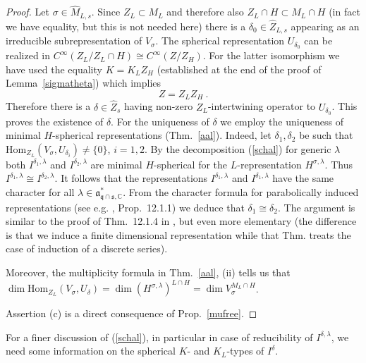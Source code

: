 \documentclass[10]{amsart}
\theoremstyle{remark}
\theoremstyle{definition}
\numberwithin{equation}{section}
\newcommand{\C}{\mathbb{C}}           %
\newcommand{\Hom}{\mathrm{Hom}}
\newcommand{\fa}{{\mathfrak a}}             %
\newcommand{\fq}{{\mathfrak q}}
\newcommand{\fs}{{\mathfrak s}}
\newcommand{\be}{\begin{equation}}
\begin{document}
{\begin{proof} Let $\sigma\in\widehat M_{L,s}$. Since $Z_L\subset M_L$ and therefore also $Z_L\cap H\subset M_L\cap H$ (in fact we have equality, but this is not needed here) there is a $\delta_0\in\widehat Z_{L,s}$ appearing as an irreducible subrepresentation of $V_\sigma$. The spherical representation $U_{\delta_0}$ can be realized in $C^\infty(Z_L/Z_L\cap H)\cong C^\infty(Z/Z_H)$.
For the latter isomorphism we have used
the equality $K=K_LZ_H$ (established at the end of the proof of Lemma~\ref{sigmatheta}) which implies 
\be\label{stand}Z=Z_LZ_H\ .
\end{equation} Therefore there is a $\delta\in \widehat Z_s$ having non-zero $Z_L$-intertwining operator to $U_{\delta_0}$. This proves the existence of $\delta$. For the uniqueness of $\delta$ we employ the uniqueness of minimal $H$-spherical representations (Thm.~\ref{aal}). Indeed, let $\delta_1,\delta_2$ be such that $\Hom_{Z_L}(V_\sigma,U_{\delta_i})\ne\{0\}$, $i=1,2$. By 
the decomposition (\ref{schal}) for generic $\lambda$ both $I^{\delta_1,\lambda}$ and $I^{\delta_2,\lambda}$ are minimal $H$-spherical for the $L$-representation $H^{\sigma,\lambda}$.
Thus $I^{\delta_1,\lambda}\cong I^{\delta_2,\lambda}$. It follows that the representations $I^{\delta_1,\lambda}$ and $I^{\delta_1,\lambda}$ have the same character for all $\lambda\in\fa_{\fq\cap\fs,\C}^*$. From the character formula for parabolically induced representations (see e.g. \cite{Wa92}, Prop.~12.1.1) we deduce that $\delta_1\cong\delta_2$.
The argument is similar to the proof of Thm.~12.1.4 in \cite{Wa92}, but even more elementary (the difference is that we induce a finite dimensional representation while that Thm. treats
the case of induction of a discrete series).

Moreover, the multiplicity formula in Thm.~\ref{aal}, (ii) tells us that $\dim\Hom_{Z_L}(V_\sigma,U_\delta)=\dim (H^{\sigma,\lambda})^{L\cap H}=\dim V_\sigma^{M_L\cap H}$.

Assertion (c) is a direct consequence of Prop.~\ref{mufree}.
\end{proof}

For a finer discussion of (\ref{schal}), in particular in case of reducibility of $I^{\delta,\lambda}$, we need some information on the spherical $K$- and $K_L$-types of $I^\delta$.

}
\end{document}

